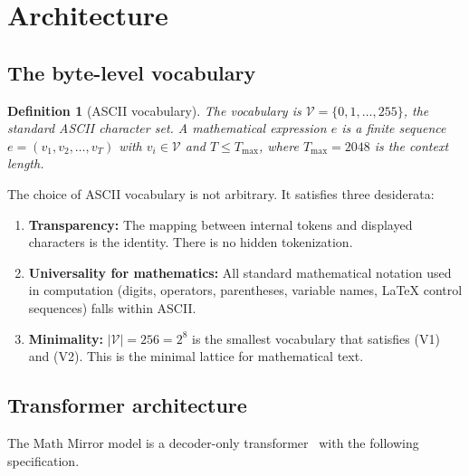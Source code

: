 \documentclass[11pt,a4paper]{article}
\newtheorem{definition}[theorem]{Definition}
\newcommand{\cV}{\mathcal{V}}
\begin{document}
\section{Architecture}\label{sec:arch}

\subsection{The byte-level vocabulary}

\begin{definition}[ASCII vocabulary]\label{def:vocab}
The vocabulary is $\cV = \{0, 1, \ldots, 255\}$,
the standard ASCII character set.
A mathematical expression $e$ is a finite sequence
$e = (v_1, v_2, \ldots, v_T)$ with $v_i \in \cV$ and
$T \leq T_{\max}$, where $T_{\max} = 2048$ is the
context length.
\end{definition}

The choice of ASCII vocabulary is not arbitrary.
It satisfies three desiderata:

\begin{enumerate}[label=(V\arabic*),nosep]
\item \textbf{Transparency:} The mapping between internal tokens
  and displayed characters is the identity.
  There is no hidden tokenization.
\item \textbf{Universality for mathematics:}
  All standard mathematical notation used in computation
  (digits, operators, parentheses, variable names, LaTeX
  control sequences) falls within ASCII.
\item \textbf{Minimality:} $|\cV| = 256 = 2^8$ is the smallest
  vocabulary that satisfies (V1) and (V2).
  This is the minimal lattice for mathematical text.
\end{enumerate}

\subsection{Transformer architecture}

The Math Mirror model is a decoder-only transformer~\cite{Vaswani2017}
with the following specification.
\end{document}
